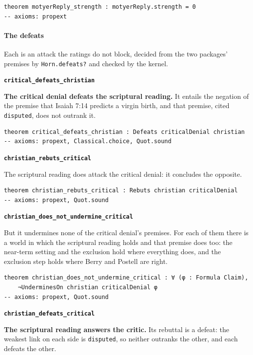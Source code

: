 \documentclass[11pt]{article}
\begin{document}
{\small\begin{verbatim}
theorem motyerReply_strength : motyerReply.strength = 0
-- axioms: propext
\end{verbatim}}
\paragraph*{The defeats}
\leavevmode\par
Each is an attack the ratings do not block, decided from the two packages' premises by \texttt{Horn.defeats?} and checked by the kernel.

\par\medskip\noindent\textbf{\texttt{critical\_\allowbreak{}defeats\_\allowbreak{}christian}}\par\nobreak\noindent
\textbf{The critical denial defeats the scriptural reading.} It entails the negation of the premise that Isaiah 7:14 predicts a virgin birth, and that premise, cited \texttt{disputed}, does not outrank it.

{\small\begin{verbatim}
theorem critical_defeats_christian : Defeats criticalDenial christian
-- axioms: propext, Classical.choice, Quot.sound
\end{verbatim}}
\par\medskip\noindent\textbf{\texttt{christian\_\allowbreak{}rebuts\_\allowbreak{}critical}}\par\nobreak\noindent
The scriptural reading does attack the critical denial: it concludes the opposite.

{\small\begin{verbatim}
theorem christian_rebuts_critical : Rebuts christian criticalDenial
-- axioms: propext, Quot.sound
\end{verbatim}}
\par\medskip\noindent\textbf{\texttt{christian\_\allowbreak{}does\_\allowbreak{}not\_\allowbreak{}undermine\_\allowbreak{}critical}}\par\nobreak\noindent
But it undermines none of the critical denial's premises. For each of them there is a world in which the scriptural reading holds and that premise does too: the near-term setting and the exclusion hold where everything does, and the exclusion step holds where Berry and Postell are right.

{\small\begin{verbatim}
theorem christian_does_not_undermine_critical : ∀ (φ : Formula Claim),
    ¬UnderminesOn christian criticalDenial φ
-- axioms: propext, Quot.sound
\end{verbatim}}
\par\medskip\noindent\textbf{\texttt{christian\_\allowbreak{}defeats\_\allowbreak{}critical}}\par\nobreak\noindent
\textbf{The scriptural reading answers the critic.} Its rebuttal is a defeat: the weakest link on each side is \texttt{disputed}, so neither outranks the other, and each defeats the other.
\end{document}
